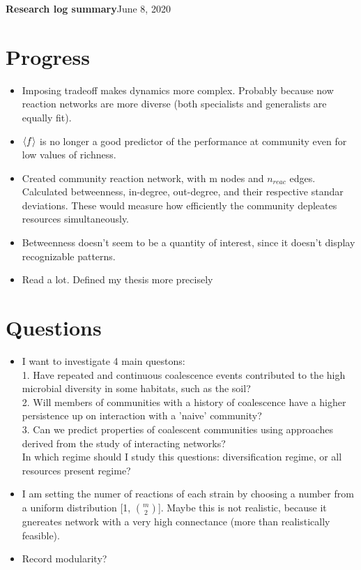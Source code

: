 \documentclass[10pt,letterpaper]{article}
\begin{document}
	
    \LARGE{\textbf{Research log summary}}\hfill\Large{June 8, 2020}
    \section*{Progress}
		\begin{itemize}
			\item Imposing tradeoff makes dynamics more complex. Probably because now reaction networks are more diverse (both specialists and generalists are equally fit).
			\item  $ \braket{f} $ is no longer a good predictor of the performance at community even for low values of richness.
			\item Created community reaction network, with m nodes and $ n_{reac} $ edges. Calculated betweenness, in-degree, out-degree, and their respective standar deviations. These would measure how efficiently the community depleates resources simultaneously.
			\item Betweenness doesn't seem to be a quantity of interest, since it doesn't display recognizable patterns. 
			\item Read a lot. Defined my thesis more precisely
    	\end{itemize}
    \section*{Questions}
	\begin{itemize}
	   \item I want to investigate 4 main questons:\\
	         1. Have repeated and continuous coalescence events contributed to the high microbial diversity in some habitats, such as the soil?\\
	        2. Will members of communities with a history of coalescence have a higher persistence up on interaction with a 'naive' community?\\
	        3. Can we predict properties of coalescent communities using approaches derived from the study of interacting networks?\\
	        In which regime should I study this questions: diversification regime, or all resources present regime?
		\item I am setting the numer of reactions of each strain by choosing a number from a uniform distribution [1, ${m}\choose{2}$]. Maybe this is not realistic, because it gnereates network with a very high connectance (more than realistically feasible).
		\item Record modularity?
	
	\end{itemize}
\end{document}
